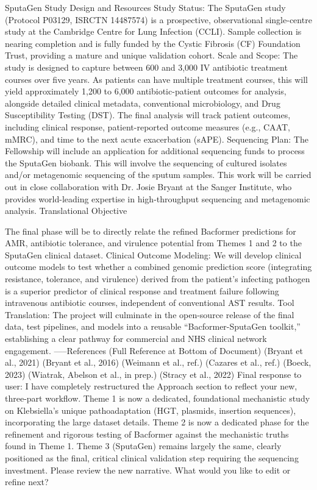 SputaGen Study Design and Resources
Study Status: The SputaGen study (Protocol P03129, ISRCTN 14487574) is a prospective, observational single-centre study at the Cambridge Centre for Lung Infection (CCLI). Sample collection is nearing completion and is fully funded by the Cystic Fibrosis (CF) Foundation Trust, providing a mature and unique validation cohort.
Scale and Scope: The study is designed to capture between 600 and 3,000 IV antibiotic treatment courses over five years. As patients can have multiple treatment courses, this will yield approximately 1,200 to 6,000 antibiotic-patient outcomes for analysis, alongside detailed clinical metadata, conventional microbiology, and Drug Susceptibility Testing (DST). The final analysis will track patient outcomes, including clinical response, patient-reported outcome measures (e.g., CAAT, mMRC), and time to the next acute exacerbation (sAPE).
Sequencing Plan: The Fellowship will include an application for additional sequencing funds to process the SputaGen biobank. This will involve the sequencing of cultured isolates and/or metagenomic sequencing of the sputum samples. This work will be carried out in close collaboration with Dr. Josie Bryant at the Sanger Institute, who provides world-leading expertise in high-throughput sequencing and metagenomic analysis.
Translational Objective

The final phase will be to directly relate the refined Bacformer predictions for AMR, antibiotic tolerance, and virulence potential from Themes 1 and 2 to the SputaGen clinical dataset.
Clinical Outcome Modeling: We will develop clinical outcome models to test whether a combined genomic prediction score (integrating resistance, tolerance, and virulence) derived from the patient's infecting pathogen is a superior predictor of clinical response and treatment failure following intravenous antibiotic courses, independent of conventional AST results.
Tool Translation: The project will culminate in the open-source release of the final data, test pipelines, and models into a reusable “Bacformer-SputaGen toolkit,” establishing a clear pathway for commercial and NHS clinical network engagement.
-----References (Full Reference at Bottom of Document)
(Bryant et al., 2021)
(Bryant et al., 2016)
(Weimann et al., ref.)
(Cazares et al., ref.)
(Boeck, 2023)
(Wiatrak, Abelson et al., in prep.)
(Stracy et al., 2022)
Final response to user: I have completely restructured the Approach section to reflect your new, three-part workflow.
Theme 1 is now a dedicated, foundational mechanistic study on Klebsiella's unique pathoadaptation (HGT, plasmids, insertion sequences), incorporating the large dataset details.
Theme 2 is now a dedicated phase for the refinement and rigorous testing of Bacformer against the mechanistic truths found in Theme 1.
Theme 3 (SputaGen) remains largely the same, clearly positioned as the final, critical clinical validation step requiring the sequencing investment.
Please review the new narrative. What would you like to edit or refine next?


